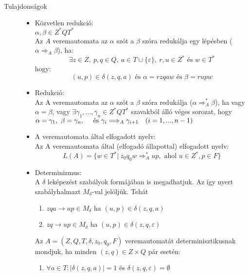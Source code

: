 \documentclass[margin=0px]{article}
\begin{document}
\begin{description}
					\item[Tulajdonságok] \hfill 
						\begin{itemize}
							\item Közvetlen redukció: \\
								$\alpha, \beta \in Z^*QT^*$\\
								Az $A$ veremautomata az $\alpha $ szót a $\beta$ szóra redukálja egy lépésben ($\alpha \Longrightarrow_A \beta$), ha:
								\[\exists z \in Z, \ p,q \in Q, \ a \in T \cup \{\varepsilon\}, \ r,u \in Z^* \textrm{ és } w\in T^*\]
								hogy:
								\[(u,p) \in \delta(z,q,a) \textrm{ és } \alpha = rzqaw \textrm{ és } \beta = rupw\]
							\item Redukció: \\
								Az A veremautomata az $\alpha$ szót a $\beta$ szóra redukálja ($\alpha \Longrightarrow_A^* \beta$), ha vagy $\alpha = \beta$, vagy 
								$ \exists \gamma_1,...,\gamma_n \in Z^*QT^*$ szavakból álló véges sorozat, hogy $\alpha = \gamma_1, \ \beta = \gamma_n, \quad \textrm{ és } \quad \\ {\gamma_i \Longrightarrow_A \gamma_{i+1} \quad (i=1,...,n-1)}$
							\item A veremautomata által elfogadott nyelv: \\
								Az A veremautomata által (elfogadó állapottal) elfogadott nyelv:
								\[L(A) = \{ w \in T^* | \ z_0q_0w \Longrightarrow_A^* up, \textrm{ ahol } u \in Z^*, p \in F \} \]
							\item Determinizmus: \\
								A $\delta$ leképezést szabályok formájában is megadhatjuk. Az így nyert szabályhalmazt $M_\delta$-val jelöljük. Tehát
								\begin{enumerate}
									\item $zqa \rightarrow up \in M_\delta$ ha $(u, p) \in \delta(z, q, a)$
									\item $zq \rightarrow up \in M_\delta$ ha $(u, p) \in \delta(z, q, \varepsilon)$
								\end{enumerate}
								
								Az $A = (Z,Q, T,\delta, z_0, q_0, F)$ veremautomatát determinisztikusnak mondjuk, ha minden $(z, q) \in Z \times Q$ pár esetén:
								\begin{enumerate}								
									\item $\forall a \in T:  |\delta(z, q, a)| = 1$ és $\delta(z, q, \varepsilon) = \emptyset$
									

\end{enumerate}
\end{itemize}
\end{description}
\end{document}
